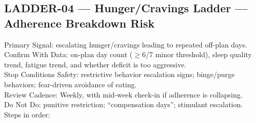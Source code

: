 \documentclass[10pt]{article}
\begin{document}
\newpage

\subsection*{LADDER-04 — Hunger/Cravings Ladder — Adherence Breakdown Risk}
{}

Primary Signal: escalating hunger/cravings leading to repeated off-plan days.\\
Confirm With Data: on-plan day count ($\geq$6/7 minor threshold), sleep quality trend, fatigue trend, and whether deficit is too aggressive.\\
Stop Conditions Safety: restrictive behavior escalation signs; binge/purge behaviors; fear-driven avoidance of eating.\\
Review Cadence: Weekly, with mid-week check-in if adherence is collapsing.\\
Do Not Do: punitive restriction; “compensation days”; stimulant escalation.\\
Steps in order:
\end{document}
